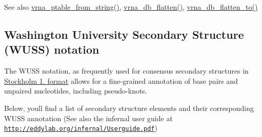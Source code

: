 \begin{DoxySeeAlso}{See also}
\hyperlink{group__struct__utils_gac76c9ef3de507748fb0416a59323362b}{vrna\+\_\+ptable\+\_\+from\+\_\+string()}, \hyperlink{group__struct__utils_gae966b9f44168a4f4b39ca42ffb5f37b7}{vrna\+\_\+db\+\_\+flatten()}, \hyperlink{group__struct__utils_ga690425199c8b71545e7196e3af1436f8}{vrna\+\_\+db\+\_\+flatten\+\_\+to()}
\end{DoxySeeAlso}
\hypertarget{rna_structure_notations_wuss-notation}{}\subsection{Washington University Secondary Structure (\+W\+U\+S\+S) notation}\label{rna_structure_notations_wuss-notation}
The W\+U\+SS notation, as frequently used for consensus secondary structures in \hyperlink{file_formats_msa-formats-stockholm}{Stockholm 1. format} allows for a fine-\/grained annotation of base pairs and unpaired nucleotides, including pseudo-\/knots.

Below, you\textquotesingle{}ll find a list of secondary structure elements and their corresponding W\+U\+SS annotation (See also the infernal user guide at \href{http://eddylab.org/infernal/Userguide.pdf}{\tt http\+://eddylab.\+org/infernal/\+Userguide.\+pdf})


